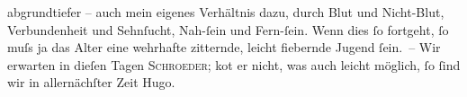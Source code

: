 \begin{ledgroupsized}[t]{13cm}
               abgrundtiefer – auch mein eigenes Verhältnis dazu, durch Blut und Nicht-Blut,
               Verbundenheit und Sehnſucht, Nah-ſein und Fern-ſein. Wenn dies ſo fortgeht, ſo muſs
               ja das Alter eine wehrhafte zitternde, leicht fiebernde Jugend ſein. – Wir erwarten in
               dieſen Tagen \textsc{Schroeder}; ko{\geminationm}t er nicht, was auch leicht möglich, ſo ſind
               wir in allernächſter Zeit \label{T_L02176_1v}\label{T_L02176_1h}\pend
           \pstart \spacefill\mbox{Hugo.}\pend{}\endnumbering{}\end{ledgroupsized}  \newcommand{\dateiname}{L02176}\newcommand{\titel}{Hugo von Hofmannsthal an Arthur Schnitzler, 16. 4. [1914]}\newcommand{\editorInnen}{Martin Anton Müller und Gerd-Hermann Susen}
            \footnotesize
\begin{ledgroupsized}[t]{11.5cm}
\end{ledgroupsized}
         
      